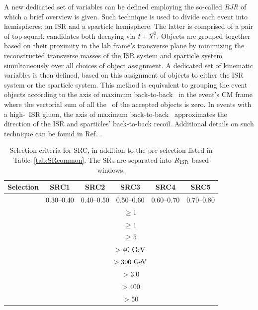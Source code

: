 				A new dedicated set of variables can be defined employing the so-called \emph{\ac{RJR}} of which a brief overview is given. Such technique is used to divide each event into hemispheres: an \ac{ISR} and a sparticle hemisphere. The latter is comprised of a pair of top-squark candidates both decaying via $t + \ninoone$. Objects are grouped together based on their proximity in the lab frame's transverse plane by minimizing the reconstructed transverse masses of the \ac{ISR} system and sparticle system simultaneously over all choices of object assignment. A dedicated set of kinematic variables is then defined, based on this assignment of objects to either the \ac{ISR} system or the sparticle system. This method is equivalent to grouping the event objects according to the axis of maximum back-to-back \pt\ in the event's \ac{CM} frame where the vectorial sum of all the \pt\ of the accepted objects is zero. In events with a high-\pT\ \ac{ISR} gluon, the axis of maximum back-to-back \pt\ approximates the direction of the \ac{ISR} and sparticles' back-to-back recoil. Additional details on such technique can be found in Ref.~\cite{RJR_ISR}.
				\begin{table}[htpb]
				  \caption{Selection criteria for SRC, in addition to the pre-selection listed in Table~\ref{tab:SRcommon}. The \acp{SR} are separated into $R_{\mathrm{ISR}}$-based windows.}
				  \begin{center}
				    \def\arraystretch{1.5}
				    \begin{tabular}{lccccc} \toprule
				      {\textbf{Selection}} & \textbf{SRC1} & \textbf{SRC2} & \textbf{SRC3} & \textbf{SRC4} & \textbf{SRC5} \\ \toprule
				      \rISR & 0.30--0.40 & 0.40--0.50 & 0.50--0.60 & 0.60--0.70 & 0.70--0.80\\ \midrule %
				      \nBJet & \multicolumn{5}{c}{$\ge1$} \\ %
				      \nBJetS & \multicolumn{5}{c}{$\ge1$} \\ %
				      \nJetS & \multicolumn{5}{c}{$\ge5$}  \\ %
				      \pTSBZero & \multicolumn{5}{c}{$>40\gev$}  \\ %
				      \mS & \multicolumn{5}{c}{$>300\gev$}  \\ %
				      \dPhiISRMET & \multicolumn{5}{c}{$>3.0$}  \\ %
				      \pTISR & \multicolumn{5}{c}{$>400$ \gev}   \\ %
				      \pTSFour & \multicolumn{5}{c}{$>50$ \gev}   \\ \bottomrule
				    \end{tabular}
				  \end{center}
				  \label{tab:SignalRegionC}
				\end{table}

